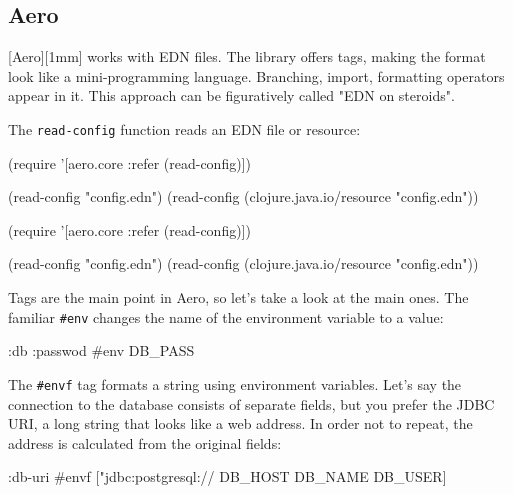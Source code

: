\subsection{Aero}


[Aero][1mm] works with EDN files. The library offers tags, making the format look like a mini-programming language. Branching, import, formatting operators appear in it. This approach can be figuratively called "EDN on steroids".


The \verb|read-config| function reads an EDN file or resource:

\ifnarrow

\begin{clojure}
(require
  '[aero.core :refer (read-config)])

(read-config "config.edn")
(read-config
  (clojure.java.io/resource
    "config.edn"))
\end{clojure}

\else

\begin{clojure}
(require '[aero.core :refer (read-config)])

(read-config "config.edn")
(read-config (clojure.java.io/resource "config.edn"))
\end{clojure}

\fi


Tags are the main point in Aero, so let's take a look at the main ones. The familiar \verb|#env| changes the name of the environment variable to a value:

\begin{clojure}
{:db {:passwod #env DB_PASS}}
\end{clojure}

The \verb|#envf| tag formats a string using environment variables. Let's say the connection to the database consists of separate fields, but you prefer the JDBC URI, a long string that looks like a web address. In order not to repeat, the address is calculated from the original fields:

\ifnarrow

\begin{clojure}
{:db-uri
 #envf ["jdbc:postgresql://%
        DB_HOST DB_NAME DB_USER]}
\end{clojure}

